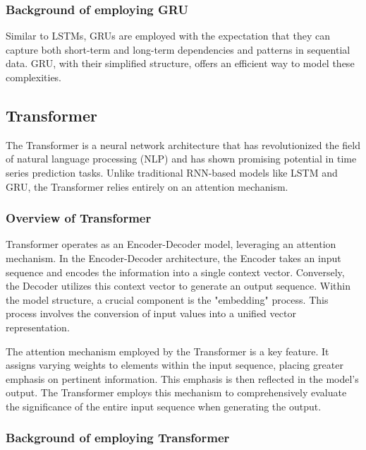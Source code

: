 \subsubsection{Background of employing GRU}

Similar to LSTMs, GRUs are employed with the expectation that they can capture both short-term and long-term dependencies and patterns in sequential data. 
GRU, with their simplified structure, offers an efficient way to model these complexities.

\subsection{Transformer}

The Transformer is a neural network architecture that has revolutionized the field of natural language processing (NLP) and has shown promising potential in time series prediction tasks. 
Unlike traditional RNN-based models like LSTM and GRU, the Transformer relies entirely on an attention mechanism.
\subsubsection{Overview of Transformer}
Transformer operates as an Encoder-Decoder model, leveraging an attention mechanism.
In the Encoder-Decoder architecture, the Encoder takes an input sequence and encodes the information into a single context vector. 
Conversely, the Decoder utilizes this context vector to generate an output sequence.
Within the model structure, a crucial component is the "embedding" process. 
This process involves the conversion of input values into a unified vector representation.

The attention mechanism employed by the Transformer is a key feature. 
It assigns varying weights to elements within the input sequence, placing greater emphasis on pertinent information. 
This emphasis is then reflected in the model's output. 
The Transformer employs this mechanism to comprehensively evaluate the significance of the entire input sequence when generating the output.

\subsubsection{Background of employing Transformer}

